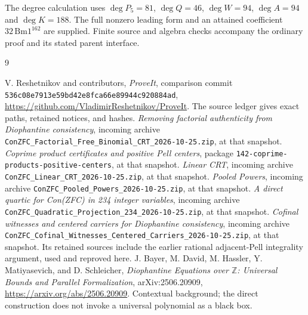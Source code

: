 \documentclass[11pt]{article}
\theoremstyle{remark}\newtheorem{remark}[theorem]{Remark}
\newcommand{\file}[1]{\nolinkurl{#1}}
\begin{document}
The degree calculation uses $\deg P_5=81$, $\deg Q=46$,
$\deg W=94$, $\deg A=94$ and $\deg K=188$.
The full nonzero leading form and an attained coefficient
$32\,\mathrm{Bm1}^{162}$ are supplied. Finite source and algebra
checks accompany the ordinary proof and its stated parent interface.



\clearpage
\begin{thebibliography}{9}
\small\raggedright\setlength{\itemsep}{3pt}
 V. Reshetnikov and contributors, \emph{ProveIt}, comparison
commit \file{536c08e7913e59bd42e8fca66e89944c920884ad},
\url{https://github.com/VladimirReshetnikov/ProveIt}.
The source ledger gives exact paths, retained notices, and hashes.
 \emph{Removing factorial authenticity from
Diophantine consistency}, incoming archive
\file{ConZFC_Factorial_Free_Binomial_CRT_2026-10-25.zip}, at that snapshot.
 \emph{Coprime product certificates and positive Pell
centers}, package \file{142-coprime-products-positive-centers},
at that snapshot.
 \emph{Linear CRT}, incoming archive
\file{ConZFC_Linear_CRT_2026-10-25.zip}, at that snapshot.
 \emph{Pooled Powers}, incoming archive
\file{ConZFC_Pooled_Powers_2026-10-25.zip}, at that snapshot.
 \emph{A direct quartic for Con(ZFC) in 234 integer
variables}, incoming archive
\file{ConZFC_Quadratic_Projection_234_2026-10-25.zip}, at that snapshot.
 \emph{Cofinal witnesses and centered carriers for
Diophantine consistency}, incoming archive
\file{ConZFC_Cofinal_Witnesses_Centered_Carriers_2026-10-25.zip},
at that snapshot. Its retained sources include the earlier rational
adjacent-Pell integrality argument, used and reproved here.
 J. Bayer, M. David, M. Hassler, Y. Matiyasevich, and
D. Schleicher, \emph{Diophantine Equations over $\mathbb Z$: Universal
Bounds and Parallel Formalization}, arXiv:2506.20909,
\url{https://arxiv.org/abs/2506.20909}. Contextual background; the
direct construction does not invoke a universal polynomial as a black box.
\end{thebibliography}
\end{document}
